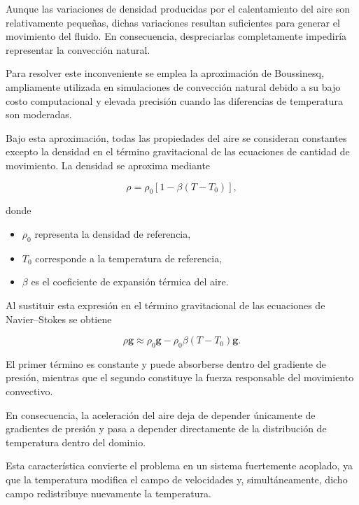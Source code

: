 Aunque las variaciones de densidad producidas por el calentamiento del aire son relativamente pequeñas, dichas variaciones resultan suficientes para generar el movimiento del fluido. En consecuencia, despreciarlas completamente impediría representar la convección natural.

Para resolver este inconveniente se emplea la aproximación de Boussinesq, ampliamente utilizada en simulaciones de convección natural debido a su bajo costo computacional y elevada precisión cuando las diferencias de temperatura son moderadas.

Bajo esta aproximación, todas las propiedades del aire se consideran constantes excepto la densidad en el término gravitacional de las ecuaciones de cantidad de movimiento. La densidad se aproxima mediante

\begin{equation}
\rho=\rho_0\left[1-\beta(T-T_0)\right],
\label{eq:boussinesq}
\end{equation}

donde

\begin{itemize}

\item $\rho_0$ representa la densidad de referencia,

\item $T_0$ corresponde a la temperatura de referencia,

\item $\beta$ es el coeficiente de expansión térmica del aire.
\end{itemize}

Al sustituir esta expresión en el término gravitacional de las ecuaciones de Navier--Stokes se obtiene

\begin{equation}
\rho\mathbf g
\approx
\rho_0\mathbf g
-
\rho_0\beta(T-T_0)\mathbf g.
\end{equation}

El primer término es constante y puede absorberse dentro del gradiente de presión, mientras que el segundo constituye la fuerza responsable del movimiento convectivo.

En consecuencia, la aceleración del aire deja de depender únicamente de gradientes de presión y pasa a depender directamente de la distribución de temperatura dentro del dominio.

Esta característica convierte el problema en un sistema fuertemente acoplado, ya que la temperatura modifica el campo de velocidades y, simultáneamente, dicho campo redistribuye nuevamente la temperatura.

